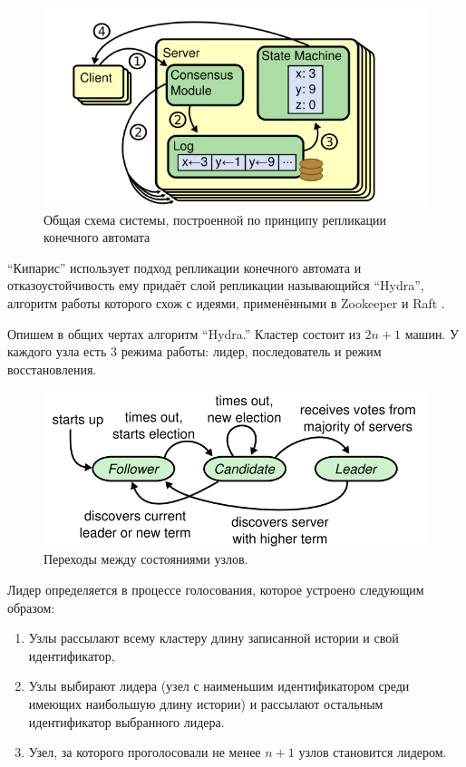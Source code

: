 \documentclass[pdftex,ptm,14pt,a4paper]{extreport}
\theoremstyle{definition}
\begin{document}
\begin{figure}
    \includegraphics[scale=0.6]{state-machine.png}
\caption{Общая схема системы, построенной по принципу репликации конечного автомата}
\end{figure}

“Кипарис” использует подход репликации конечного автомата\cite{state-replication} и
отказоустойчивость ему придаёт слой репликации называющийся “Hydra”, алгоритм работы которого схож с идеями,
применёнными в Zookeeper \cite{zookeeper} и Raft \cite{raft}.

Опишем в общих чертах алгоритм “Hydra.”
Кластер состоит из $2n+1$ машин.
У каждого узла есть 3 режима работы: лидер, последователь и режим восстановления.

\begin{figure}
    \centering
    \includegraphics[scale=0.6]{raft-states.png}
    \caption{Переходы между состояниями узлов.}
\end{figure}

Лидер определяется в процессе голосования, которое устроено следующим образом:
\begin{enumerate}
    \item Узлы рассылают всему кластеру длину записанной истории и свой идентификатор,
    \item Узлы выбирают лидера (узел с наименьшим идентификатором среди имеющих наибольшую длину истории)
        и рассылают остальным идентификатор выбранного лидера.
    \item Узел, за которого проголосовали не менее $n+1$ узлов становится лидером.
\end{enumerate}
\end{document}
